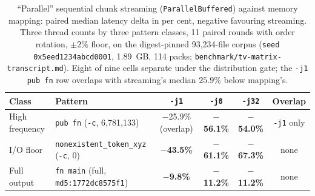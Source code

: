\documentclass[11pt,letterpaper]{article}
\begin{document}
\begin{table}[htbp]
\centering
\footnotesize
\caption{``Parallel'' sequential chunk streaming (\texttt{ParallelBuffered})
against memory mapping: paired median latency delta in per cent, negative
favouring streaming. Three thread counts by three pattern classes, 11 paired
rounds with order rotation, $\pm 2\%$ floor, on the digest-pinned
93{,}234-file corpus (\texttt{seed 0x5eed1234abcd0001}, 1.89~GB, 114 packs;
\texttt{benchmark/tv-matrix-transcript.md}). Eight of nine cells separate
under the distribution gate; the \texttt{-j1} \texttt{pub fn} row overlaps
with streaming's median $25.9\%$ below mapping's.}
\label{tab:nine}
\begin{tabular}{@{}llcccc@{}}
\toprule
\textbf{Class} & \textbf{Pattern}
  & \textbf{\texttt{-j1}} & \textbf{\texttt{-j8}} & \textbf{\texttt{-j32}}
  & \textbf{Overlap} \\
\midrule
High frequency & \texttt{pub fn} (\texttt{-c}, 6{,}781{,}133) & $-$25.9\% (overlap) & $-$\textbf{56.1\%} & $-$\textbf{54.0\%} & \texttt{-j1} only \\
I/O floor      & \texttt{nonexistent\_token\_xyz} (\texttt{-c}, 0) & $-$\textbf{43.5\%} & $-$\textbf{61.1\%} & $-$\textbf{67.3\%} & none \\
Full output    & \texttt{fn main} (full, \texttt{md5:1772dc8575f1}) & $-$\textbf{9.8\%} & $-$\textbf{11.2\%} & $-$\textbf{11.2\%} & none \\
\bottomrule
\end{tabular}
\end{table}
\end{document}
